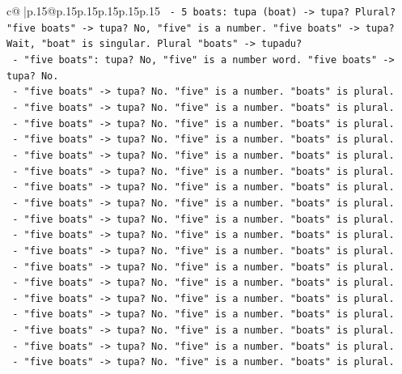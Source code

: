 \documentclass{article}
\begin{document}
{\begin{supertabular}{c@{$\;$}|p{.15\linewidth}@{}p{.15\linewidth}p{.15\linewidth}p{.15\linewidth}p{.15\linewidth}p{.15\linewidth}}
{{{\texttt{   {-} 5 boats: tupa (boat) {-}> tupa? Plural? "five boats" {-}> tupa? No, "five" is a number. "five boats" {-}> tupa? Wait, "boat" is singular. Plural "boats" {-}> tupadu?} \\
\texttt{   {-} "five boats": tupa? No, "five" is a number word. "five boats" {-}> tupa? No.} \\
\texttt{   {-} "five boats" {-}> tupa? No. "five" is a number. "boats" is plural.} \\
\texttt{   {-} "five boats" {-}> tupa? No. "five" is a number. "boats" is plural.} \\
\texttt{   {-} "five boats" {-}> tupa? No. "five" is a number. "boats" is plural.} \\
\texttt{   {-} "five boats" {-}> tupa? No. "five" is a number. "boats" is plural.} \\
\texttt{   {-} "five boats" {-}> tupa? No. "five" is a number. "boats" is plural.} \\
\texttt{   {-} "five boats" {-}> tupa? No. "five" is a number. "boats" is plural.} \\
\texttt{   {-} "five boats" {-}> tupa? No. "five" is a number. "boats" is plural.} \\
\texttt{   {-} "five boats" {-}> tupa? No. "five" is a number. "boats" is plural.} \\
\texttt{   {-} "five boats" {-}> tupa? No. "five" is a number. "boats" is plural.} \\
\texttt{   {-} "five boats" {-}> tupa? No. "five" is a number. "boats" is plural.} \\
\texttt{   {-} "five boats" {-}> tupa? No. "five" is a number. "boats" is plural.} \\
\texttt{   {-} "five boats" {-}> tupa? No. "five" is a number. "boats" is plural.} \\
\texttt{   {-} "five boats" {-}> tupa? No. "five" is a number. "boats" is plural.} \\
\texttt{   {-} "five boats" {-}> tupa? No. "five" is a number. "boats" is plural.} \\
\texttt{   {-} "five boats" {-}> tupa? No. "five" is a number. "boats" is plural.} \\
\texttt{   {-} "five boats" {-}> tupa? No. "five" is a number. "boats" is plural.} \\
\texttt{   {-} "five boats" {-}> tupa? No. "five" is a number. "boats" is plural.} \\
\texttt{   {-} "five boats" {-}> tupa? No. "five" is a number. "boats" is plural.} \\
}}}
\end{supertabular}}
\end{document}
